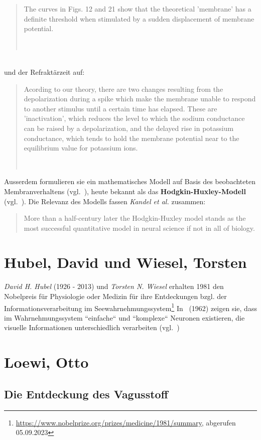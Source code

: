\blockquote[{~\cite[535]{HH52}}]{
    The curves in Figs. 12 and 21 show that the theoretical 'membrane' has a definite threshold when stimulated by a sudden displacement of membrane potential.
}\\

\noindent
und der Refraktärzeit auf:

\blockquote[{~\cite[532]{HH52}}]{
    Acording to our theory, there are two changes resulting from the depolarization during a spike which make the membrane unable to respond to another stimulus until a certain time has elapsed. These are 'inactivation', which reduces the level to which the sodium conductance can be raised by a depolarization, and the delayed rise in potassium conductance, which tends to hold the membrane potential near to the equilibrium value for potassium ions.
}

Ausserdem formulieren sie ein mathematisches Modell auf Basis des beobachteten Membranverhaltens (vgl.~\cite[501, Fig. 1.]{HH52}), heute bekannt als das \textbf{Hodgkin-Huxley-Modell} (vgl.~\cite[144]{Koc98}).
 Die Relevanz des Modells fassen \textit{Kandel et al.} zusammen:

\blockquote[{\cite[156]{KSJ+13}}]{
    More than a half-century later the Hodgkin-Huxley model stands as the most successful quantitative model in neural science if not in all of biology.
}



\section{Hubel, David und Wiesel, Torsten}\label{appendix:hubelwiesel}

\textit{David H. Hubel} (1926 - 2013) und \textit{Torsten N. Wiesel} erhalten 1981 den Nobelpreis für Physiologie oder Medizin für ihre Entdeckungen bzgl. der Informationsverarbeitung im Seewahrnehmungssystem\footnote{
    \url{https://www.nobelprize.org/prizes/medicine/1981/summary}, abgerufen 05.09.2023
}
In~\cite{HW62} (1962) zeigen sie, dass im Wahrnehmungssystem ``einfache`` und ``komplexe`` Neuronen existieren, die visuelle Informationen unterschiedlich verarbeiten (vgl.~\cite[2819]{Wur09})

\section{Loewi, Otto}\label{appendix:loewi}
\subsection*{Die Entdeckung des Vagusstoff}

